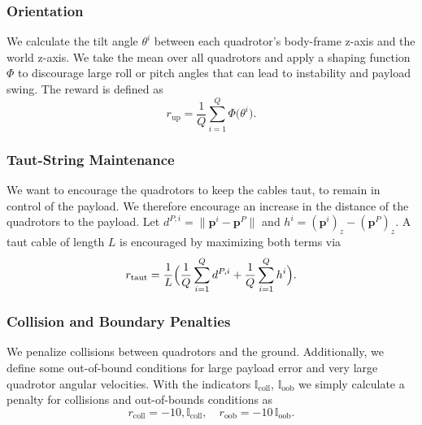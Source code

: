 \subsubsection{Orientation}
We calculate the tilt angle \(\theta^i\) between each quadrotor's body-frame z-axis and the world z-axis. We take the mean over all quadrotors and apply a shaping function \(\Phi\) to discourage large roll or pitch angles that can lead to instability and payload swing. The reward is defined as
\begin{equation}
r_{\mathrm{up}}
= \frac{1}{Q}\sum_{i=1}^Q \Phi\bigl(\theta^i\bigr).
\end{equation}

\subsubsection{Taut-String Maintenance}
We want to encourage the quadrotors to keep the cables taut, to remain in control of the payload. We therefore encourage an increase in the distance of the quadrotors to the payload. Let \(d^{P,i}=\lVert\mathbf{p}^i-\mathbf{p}^P\rVert\) and \(h^i=(\mathbf{p}^i)_z-(\mathbf{p}^P)_z\). A taut cable of length \(L\) is encouraged by maximizing both terms via
\begin{equation}
r_{\mathrm{taut}}
= \frac{1}{L}\Bigl(\frac{1}{Q}\sum_{i=1}^Q d^{P,i} + \frac{1}{Q}\sum_{i=1}^Q h^i\Bigr).
\end{equation}


\subsubsection{Collision and Boundary Penalties}
We penalize collisions between quadrotors and the ground. Additionally, we define some out-of-bound conditions for large payload error and very large quadrotor angular velocities.
With the indicators \(\mathbb{I}_{\mathrm{coll}}\), \(\mathbb{I}_{\mathrm{oob}}\) we simply calculate a penalty for collisions and out-of-bounds conditions as
\begin{equation}
r_{\mathrm{coll}} = -10,\mathbb{I}_{\mathrm{coll}}, 
\quad
r_{\mathrm{oob}} = -10\,\mathbb{I}_{\mathrm{oob}}.
\end{equation}

